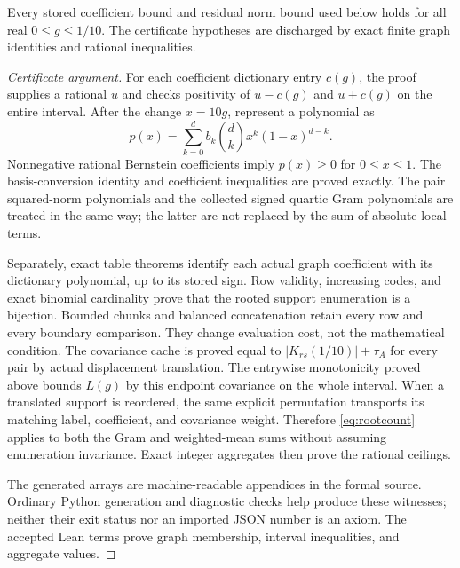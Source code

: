 \begin{proposition}\label{prop:interval}
Every stored coefficient bound and residual norm bound used below holds for
all real $0\le g\le1/10$. The certificate hypotheses are discharged by exact
finite graph identities and rational inequalities.
\end{proposition}
\begin{proof}[Certificate argument]
For each coefficient dictionary entry $c(g)$, the proof supplies a rational
$u$ and checks positivity of $u-c(g)$ and $u+c(g)$ on the entire interval.
After the change $x=10g$, represent a polynomial as
\[
 p(x)=\sum_{k=0}^{d} b_k\binom dk x^k(1-x)^{d-k}.
\]
Nonnegative rational Bernstein coefficients imply $p(x)\ge0$ for $0\le x\le1$.
The basis-conversion identity and coefficient inequalities are proved exactly.
The pair squared-norm polynomials and the collected signed quartic Gram
polynomials are treated in the same way; the latter are not replaced by the
sum of absolute local terms.

Separately, exact table theorems identify each actual graph coefficient with
its dictionary polynomial, up to its stored sign. Row validity, increasing
codes, and exact binomial cardinality prove that the rooted support enumeration
is a bijection. Bounded chunks and balanced concatenation retain every row and
every boundary comparison. They change evaluation cost, not the mathematical
condition. The covariance cache is proved equal to $|K_{rs}(1/10)|+\tau_A$
for every pair by actual displacement translation. The entrywise monotonicity
proved above bounds $L(g)$ by this endpoint covariance on the whole interval. When a translated support
is reordered, the same explicit permutation transports its matching label,
coefficient, and covariance weight. Therefore \eqref{eq:rootcount} applies to
both the Gram and weighted-mean sums without assuming enumeration invariance.
Exact integer aggregates then prove the rational ceilings.

The generated arrays are machine-readable appendices in the formal source.
Ordinary Python generation and diagnostic checks help produce these witnesses;
neither their exit status nor an imported JSON number is an axiom. The accepted
Lean terms prove graph membership, interval inequalities, and aggregate values.
\end{proof}

